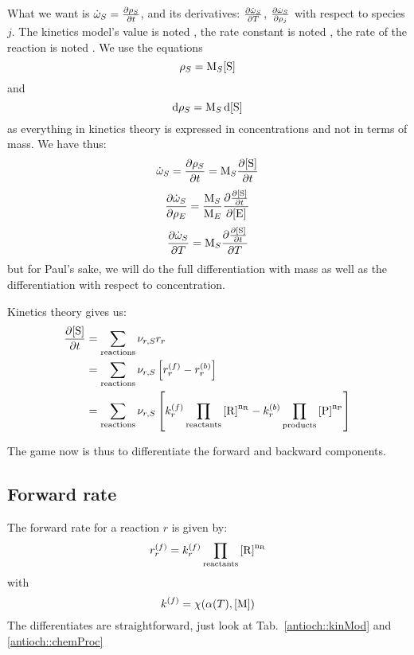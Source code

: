 What we want is 
$\mdot[S] = \doverdt{\mass[S]}$, and its derivatives:
$\doverdT{\mdot[S]}$, $\doverdm[j]{\mdot[S]}$ with respect to species $j$.
%
The kinetics model's value is noted \kinMod, the rate constant is noted \rateCons, the
rate of the reaction is noted \rate.
%
We use the equations
\begin{equation}
\mass[S] = \Mm[S] \conc[S]
\end{equation}
and
\begin{equation}
\dd\mass[S] = \Mm[S]\,\dd\conc[S]
\end{equation}
as everything in kinetics theory is expressed in concentrations and 
not in terms of mass.
We have thus:
\begin{equation}
\mdot[S] = \doverdt{\mass[S]} = \Mm[S] \doverdt{\conc[S]}
\end{equation}
\begin{equation}
\doverdm[E]{\mdot[S]} = \frac{\Mm[S]}{\Mm[E]}\doverdc[E]{\doverdt{\conc[S]}}
\label{derive:m_T}
\end{equation}
\begin{equation}
\doverdT{\mdot[S]} = \Mm[S]\doverdT{\doverdt{\conc[S]}}
\label{derive:m_c}
\end{equation}
but for Paul's sake, we will do the full differentiation with mass as well
as the differentiation with respect to concentration.

Kinetics theory gives us:
\begin{equation}
\begin{split}
\doverdt{\conc[S]} & = \sum_{\text{reactions}} \scoef[r,S] \rate[r] \\
                   & = \sum_{\text{reactions}} \scoef[r,S] \left[\fwdrate[r] - \bkwdrate[r]\right]\\
                   & = \sum_{\text{reactions}} \scoef[r,S]
                        \left[ \fwdratecons[r] \prodReac - \bkwdratecons[r] \prodProd \right]
\end{split}
\end{equation}

The game now is thus to differentiate the forward and backward components.
\subsection{Forward rate}

The forward rate \fwdrate[r] for a reaction $r$ is given by:
\begin{equation}
\fwdrate[r] = \fwdratecons[r] \prodReac
\label{ratefDef}
\end{equation}
with
\begin{equation}
\fwdratecons = \chemProc
\end{equation}
The differentiates are straightforward, just look at Tab.~\ref{antioch::kinMod}
and \ref{antioch::chemProc}


